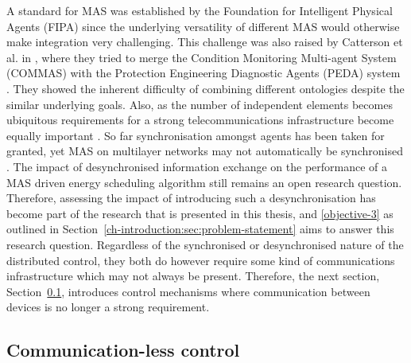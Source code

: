 A standard for MAS was established by the Foundation for Intelligent Physical Agents (FIPA) since the underlying versatility of different MAS would otherwise make integration very challenging.
This challenge was also raised by Catterson et al. in \cite{Catterson2005}, where they tried to merge the Condition Monitoring Multi-agent System (COMMAS) \cite{McArthur2004a} with the Protection Engineering Diagnostic Agents (PEDA) system \cite{Hossack2003a}.
They showed the inherent difficulty of combining different ontologies despite the similar underlying goals.
Also, as the number of independent elements becomes ubiquitous requirements for a strong telecommunications infrastructure become equally important \cite{Hatziargyriou2015}.
So far synchronisation amongst agents has been taken for granted, yet MAS on multilayer networks may not automatically be synchronised \cite{He2017}.
The impact of desynchronised information exchange on the performance of a MAS driven energy scheduling algorithm still remains an open research question.
Therefore, assessing the impact of introducing such a desynchronisation has become part of the research that is presented in this thesis, and \ref{objective-3} as outlined in Section~\ref{ch-introduction:sec:problem-statement} aims to answer this research question.
Regardless of the synchronised or desynchronised nature of the distributed control, they both do however require some kind of communications infrastructure which may not always be present.
Therefore, the next section, Section~\ref{ch-literature:subsec:communication-less-control}, introduces control mechanisms where communication between devices is no longer a strong requirement.

\subsection{Communication-less control}
\label{ch-literature:subsec:communication-less-control}

